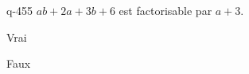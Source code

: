 \begin{truefalse}{q-455}
$ab+2a+3b+6$ est factorisable par $a+3$.
\item* Vrai
\item Faux
\end{truefalse}

